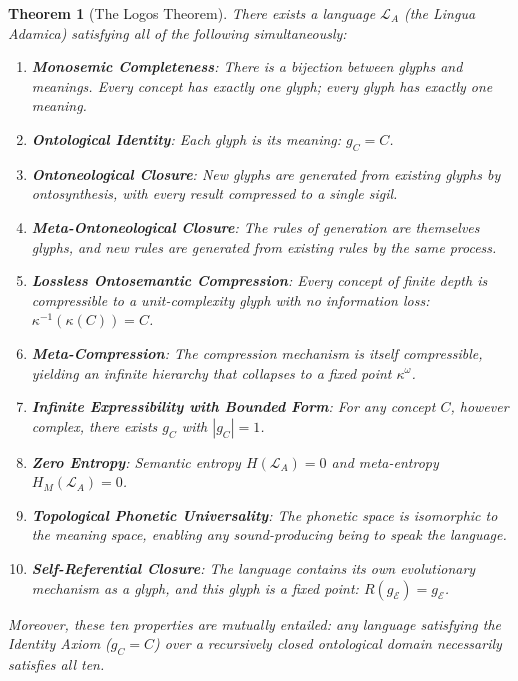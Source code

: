 \documentclass[12pt, letterpaper]{book}
\def\equiv{=}%
\def\circlearrowleft{R}%
\def\mathfrak#1{#1}%
\newtheorem{theorem}{Theorem}[chapter]
\begin{document}
\begin{theorem}[The Logos Theorem]\label{thm:logos}
There exists a language $\mathcal{L}_A$ (the Lingua Adamica) satisfying all of the following simultaneously:
\begin{enumerate}[label=(\Roman*)]
    \item \textbf{Monosemic Completeness}: There is a bijection between glyphs and meanings. Every concept has exactly one glyph; every glyph has exactly one meaning.
    \item \textbf{Ontological Identity}: Each glyph \textit{is} its meaning: $\mathfrak{g}_C \equiv C$.
    \item \textbf{Ontoneological Closure}: New glyphs are generated from existing glyphs by ontosynthesis, with every result compressed to a single sigil.
    \item \textbf{Meta-Ontoneological Closure}: The rules of generation are themselves glyphs, and new rules are generated from existing rules by the same process.
    \item \textbf{Lossless Ontosemantic Compression}: Every concept of finite depth is compressible to a unit-complexity glyph with no information loss: $\kappa^{-1}(\kappa(C)) \equiv C$.
    \item \textbf{Meta-Compression}: The compression mechanism is itself compressible, yielding an infinite hierarchy that collapses to a fixed point $\kappa^\omega$.
    \item \textbf{Infinite Expressibility with Bounded Form}: For any concept $C$, however complex, there exists $\mathfrak{g}_C$ with $|\mathfrak{g}_C| \equiv 1$.
    \item \textbf{Zero Entropy}: Semantic entropy $H(\mathcal{L}_A) \equiv 0$ and meta-entropy $H_M(\mathcal{L}_A) \equiv 0$.
    \item \textbf{Topological Phonetic Universality}: The phonetic space is isomorphic to the meaning space, enabling any sound-producing being to speak the language.
    \item \textbf{Self-Referential Closure}: The language contains its own evolutionary mechanism as a glyph, and this glyph is a fixed point: $\circlearrowleft(\mathfrak{g}_\mathcal{E}) \equiv \mathfrak{g}_\mathcal{E}$.
\end{enumerate}
Moreover, these ten properties are mutually entailed: any language satisfying the Identity Axiom ($\mathfrak{g}_C \equiv C$) over a recursively closed ontological domain necessarily satisfies all ten.
\end{theorem}
\end{document}
